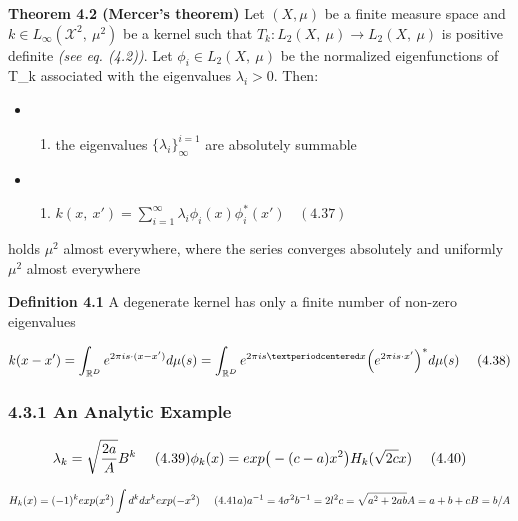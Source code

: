 \documentclass[
]{article}
\providecommand{\tightlist}{%
  \setlength{\itemsep}{0pt}\setlength{\parskip}{0pt}}
\begin{document}
\textbf{Theorem 4.2 (Mercer's theorem)} Let \((X, \mu)\) be a finite
measure space and \(k \in L_\infty (\mathcal X^2,\ \mu^2)\) be a kernel
such that \(T_k: L_2(X,\ \mu) \rightarrow L_2(X,\ \mu)\) is positive
definite \emph{(see eq. (4.2))}. Let \(\phi_i \in L_2(X,\ \mu)\) be the
normalized eigenfunctions of T\_k associated with the eigenvalues
\(\lambda_i > 0\). Then:

\begin{itemize}
\item
  \begin{enumerate}
  \def\labelenumi{\arabic{enumi}.}
  \tightlist
  \item
    the eigenvalues \(\{\lambda_i\}_\infty ^{i=1}\) are absolutely
    summable
  \end{enumerate}
\item
  \begin{enumerate}
  \def\labelenumi{\arabic{enumi}.}
  \setcounter{enumi}{1}
  \tightlist
  \item
    \(k(x,\ x') = \sum^{\infty}_{i=1} \lambda_i\phi_i(x)\phi^*_i (x')\ \ \ \ (4.37)\)
  \end{enumerate}
\end{itemize}

holds \(\mu^2\) almost everywhere, where the series converges absolutely
and uniformly \(\mu^2\) almost everywhere

\textbf{Definition 4.1} A degenerate kernel has only a finite number of
non-zero eigenvalues

\[
k(x - x') = \int_{\mathbb R^D}
e^{2\pi is \cdot (x-x')} d\mu(s) \\
= \int_{\mathbb R^D}
e^{2\pi is·x} \Big(e^{2\pi is \cdot x'}\Big)^* d\mu(s)
\ \ \ \ (4.38)
\]

\hypertarget{an-analytic-example}{%
\subsubsection{4.3.1 An Analytic Example}\label{an-analytic-example}}

\[
\lambda_k = \sqrt{\frac {2a} A} B^k \ \ \ \ (4.39)\\
\phi_k(x) = exp \big(- (c - a)x^2\big)H_k(\sqrt{2c}x)\ \ \ \ (4.40)
\]

\[
 H_k(x) = (-1)^k exp(x^2) \int {d^k} {dx^k} exp(-x^2) 
\ \ \ \ (4.41a)\\
a^{-1}=4\sigma^2\\
b^{-1}=2l^2\\
c=\sqrt{a^2 + 2ab}\\
A=a+b+c\\
B= b/A
\]
\end{document}
